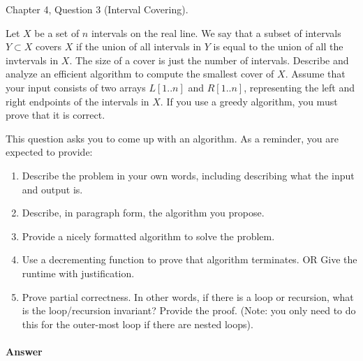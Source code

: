 \documentclass{article}
\begin{document}


\nextprob
{}

Chapter 4, Question 3 (Interval Covering).

Let $X$ be a set of $n$ intervals on the real line.
We say that a subset of intervals $Y \subset X$ covers $X$ if the union of all intervals in $Y$ is equal to the union of all the invtervals in $X$.
The size of a cover is just the number of intervals.
Describe and analyze an efficient algorithm to compute the smallest cover of $X$.
Assume that your input consists of two arrays $L[1..n]$ and $R[1..n]$, representing the left and right endpoints of the intervals in $X$.
If you use a greedy algorithm, you must prove that it is correct.

This question asks you to come up with an algorithm.  As a reminder, you are
expected to provide:
\begin{enumerate}
    \item Describe the problem in your own words, including
        describing what the input and output is.
    \item Describe, in paragraph form, the algorithm you propose.
    \item Provide a nicely formatted algorithm to solve the problem.
    \item Use a decrementing function to prove that algorithm terminates.
            OR  Give the runtime with justification.
    \item Prove partial correctness.  In other words, if there is a loop or
        recursion, what is the loop/recursion invariant? Provide the proof.
        (Note: you only need to do this for the outer-most loop if there are
        nested loops).
\end{enumerate}



\paragraph{Answer}
\end{document}
